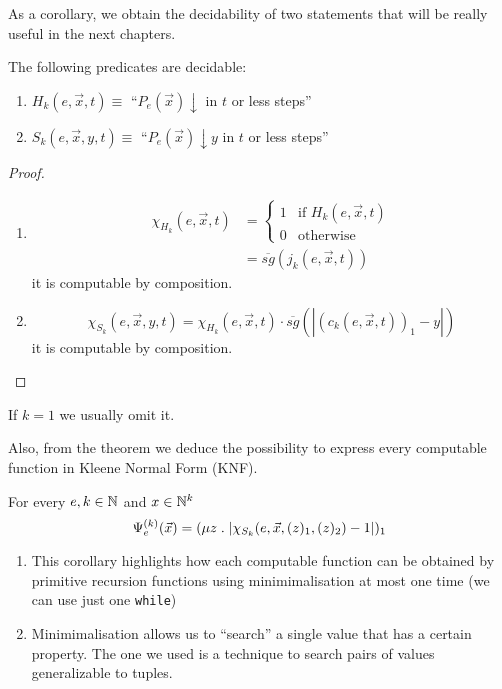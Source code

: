 As a corollary, we obtain the decidability of two statements that will
be really useful in the next chapters.
\begin{corollary}
  The following predicates are decidable:
  \begin{enumerate}[label=(\alph*)]
  \item $H_k(e, \vec{x}, t) \equiv$ ``$P_e(\vec{x})\downarrow$ in $t$
    or less steps''
  \item $S_k(e, \vec{x}, y, t) \equiv$ ``$P_e(\vec{x})\downarrow y$ in
    $t$ or less steps''
  \end{enumerate}
  \begin{proof}
    \begin{enumerate}[label=(\alph*)]
    \item 
      \begin{align*}
        \chi_{H_k}(e, \vec{x}, t) &= 
        \begin{cases}
          1 & \mbox{if } H_k(e, \vec{x}, t)\\
          0 & \mbox{otherwise}
        \end{cases} \\
        &= \overline{sg}(j_k(e,\vec{x},t))
      \end{align*}
      it is computable by composition.
    \item \[
      \chi_{S_k}(e, \vec{x}, y, t) = \chi_{H_k}(e, \vec{x}, t) 
      \cdot \overline{sg}(|(c_k(e,\vec{x},t))_1 - y|) 
    \]
    it is computable by composition.
    \end{enumerate}
  \end{proof}
  If $k=1$ we usually omit it.
\end{corollary}

Also, from the theorem we deduce the possibility to express every
computable function in Kleene Normal Form (KNF).
\begin{corollary}
  For every $e,k \in \mathbb{N}$ and $x \in \mathbb{N}^k$
  \[
    \Psi_e^{(k)} (\vec{x}) = (\mu z \;.\; |\chi_{S_k}(e, \vec{x}, (z)_1, (z)_2) - 1|)_1
  \]
\end{corollary}

\begin{observation}
  \begin{enumerate}[label=\roman*.]
    \item This corollary highlights how each computable function can be obtained by primitive recursion
      functions using minimimalisation at most one time (we can use just one
      \texttt{while})
    \item Minimimalisation allows us to ``search'' a single value that has a
      certain property. The one we used is a technique to search pairs
      of values generalizable to tuples.
    \end{enumerate}
\end{observation}


